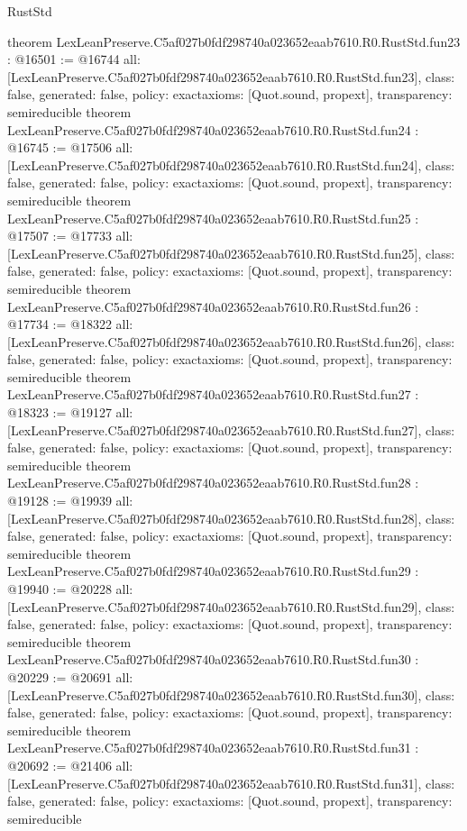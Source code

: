 \begin{lexlean}{RustStd}
\begin{coremodule}
{}
theorem LexLeanPreserve.C5af027b0fdf298740a023652eaab7610.R0.RustStd.fun23 : @16501 := @16744 {
  all: [LexLeanPreserve.C5af027b0fdf298740a023652eaab7610.R0.RustStd.fun23],
  class: false,
  generated: false,
  policy: exact{axioms: [Quot.sound, propext]},
  transparency: semireducible
}
theorem LexLeanPreserve.C5af027b0fdf298740a023652eaab7610.R0.RustStd.fun24 : @16745 := @17506 {
  all: [LexLeanPreserve.C5af027b0fdf298740a023652eaab7610.R0.RustStd.fun24],
  class: false,
  generated: false,
  policy: exact{axioms: [Quot.sound, propext]},
  transparency: semireducible
}
theorem LexLeanPreserve.C5af027b0fdf298740a023652eaab7610.R0.RustStd.fun25 : @17507 := @17733 {
  all: [LexLeanPreserve.C5af027b0fdf298740a023652eaab7610.R0.RustStd.fun25],
  class: false,
  generated: false,
  policy: exact{axioms: [Quot.sound, propext]},
  transparency: semireducible
}
theorem LexLeanPreserve.C5af027b0fdf298740a023652eaab7610.R0.RustStd.fun26 : @17734 := @18322 {
  all: [LexLeanPreserve.C5af027b0fdf298740a023652eaab7610.R0.RustStd.fun26],
  class: false,
  generated: false,
  policy: exact{axioms: [Quot.sound, propext]},
  transparency: semireducible
}
theorem LexLeanPreserve.C5af027b0fdf298740a023652eaab7610.R0.RustStd.fun27 : @18323 := @19127 {
  all: [LexLeanPreserve.C5af027b0fdf298740a023652eaab7610.R0.RustStd.fun27],
  class: false,
  generated: false,
  policy: exact{axioms: [Quot.sound, propext]},
  transparency: semireducible
}
theorem LexLeanPreserve.C5af027b0fdf298740a023652eaab7610.R0.RustStd.fun28 : @19128 := @19939 {
  all: [LexLeanPreserve.C5af027b0fdf298740a023652eaab7610.R0.RustStd.fun28],
  class: false,
  generated: false,
  policy: exact{axioms: [Quot.sound, propext]},
  transparency: semireducible
}
theorem LexLeanPreserve.C5af027b0fdf298740a023652eaab7610.R0.RustStd.fun29 : @19940 := @20228 {
  all: [LexLeanPreserve.C5af027b0fdf298740a023652eaab7610.R0.RustStd.fun29],
  class: false,
  generated: false,
  policy: exact{axioms: [Quot.sound, propext]},
  transparency: semireducible
}
theorem LexLeanPreserve.C5af027b0fdf298740a023652eaab7610.R0.RustStd.fun30 : @20229 := @20691 {
  all: [LexLeanPreserve.C5af027b0fdf298740a023652eaab7610.R0.RustStd.fun30],
  class: false,
  generated: false,
  policy: exact{axioms: [Quot.sound, propext]},
  transparency: semireducible
}
theorem LexLeanPreserve.C5af027b0fdf298740a023652eaab7610.R0.RustStd.fun31 : @20692 := @21406 {
  all: [LexLeanPreserve.C5af027b0fdf298740a023652eaab7610.R0.RustStd.fun31],
  class: false,
  generated: false,
  policy: exact{axioms: [Quot.sound, propext]},
  transparency: semireducible
}
\end{coremodule}
\end{lexlean}
